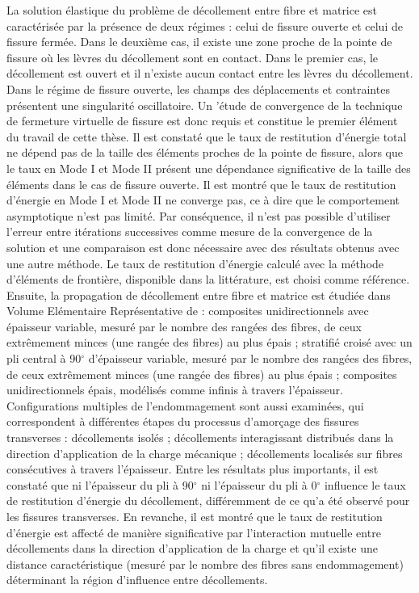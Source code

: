 La solution \'elastique du probl\`eme de d\'ecollement entre fibre et matrice est caract\'eris\'ee par la pr\'esence de deux r\'egimes : celui de fissure ouverte et celui de fissure ferm\'ee. Dans le deuxi\`eme cas, il existe une zone proche de la pointe de fissure o\`u les l\`evres du d\'ecollement sont en contact. Dans le premier cas, le d\'ecollement est ouvert et il n'existe aucun contact entre les l\`evres du d\'ecollement. Dans le r\'egime de fissure ouverte, les champs des d\'eplacements et contraintes pr\'esentent une singularit\'e oscillatoire. Un '\'etude de convergence de la technique de fermeture virtuelle de fissure est donc requis et constitue le premier \'el\'ement du travail de cette th\`ese. Il est constat\'e que le taux de restitution d'\'energie total ne d\'epend pas de la taille des \'el\'ements proches de la pointe de fissure, alors que le taux en Mode I et Mode II pr\'esent une d\'ependance significative de la taille des \'el\'ements dans le cas de fissure ouverte. Il est montr\'e que le taux de restitution d'\'energie en Mode I et Mode II ne converge pas, ce \`a dire que le comportement asymptotique n'est pas limit\'e. Par cons\'equence, il n'est pas possible d'utiliser l'erreur entre it\'erations successives comme mesure de la convergence de la solution et une comparaison est donc n\'ecessaire avec des r\'esultats obtenus avec une autre m\'ethode. Le taux de restitution d'\'energie calcul\'e avec la m\'ethode d'\'el\'ements de fronti\`ere, disponible dans la litt\'erature, est choisi comme r\'ef\'erence.\\

Ensuite, la propagation de d\'ecollement entre fibre et matrice est \'etudi\'ee dans Volume El\'ementaire Repr\'esentative de : composites unidirectionnels avec \'epaisseur variable, mesur\'e par le nombre des rang\'ees des fibres, de ceux extr\^emement minces (une rang\'ee des fibres) au plus \'epais ; stratifi\'e crois\'e avec un pli central \`a 90$^{\circ}$ d'\'epaisseur variable, mesur\'e par le nombre des rang\'ees des fibres, de ceux extr\^emement minces (une rang\'ee des fibres) au plus \'epais ; composites unidirectionnels \'epais, mod\'elis\'es comme infinis \`a travers l'\'epaisseur. Configurations multiples de l'endommagement sont aussi examin\'ees, qui correspondent \`a diff\'erentes \'etapes du processus d'amor\c{c}age des fissures transverses : d\'ecollements isol\'es ; d\'ecollements interagissant distribu\'es dans la direction d'application de la charge m\'ecanique ; d\'ecollements localis\'es sur fibres cons\'ecutives \`a travers l'\'epaisseur. Entre les r\'esultats plus importants, il est constat\'e que ni l'\'epaisseur du pli \`a 90$^{\circ}$ ni l'\'epaisseur du pli \`a 0$^{\circ}$ influence le taux de restitution d'\'energie du d\'ecollement, diff\'eremment de ce qu'a \'et\'e observ\'e pour les fissures transverses. En revanche, il est montr\'e que le taux de restitution d'\'energie est affect\'e de mani\`ere significative par l'interaction mutuelle entre d\'ecollements dans la direction d'application de la charge et qu'il existe une distance caract\'eristique (mesur\'e par le nombre des fibres sans endommagement) d\'eterminant la r\'egion d'influence entre d\'ecollements.\\

